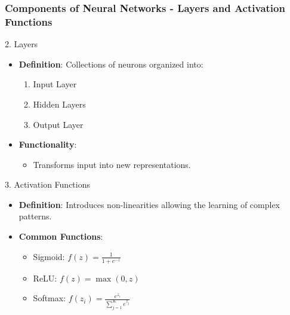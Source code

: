 \documentclass[aspectratio=169]{beamer}
\begin{document}
\begin{frame}[fragile]
    \frametitle{Components of Neural Networks - Layers and Activation Functions}
    \begin{block}{2. Layers}
        \begin{itemize}
            \item \textbf{Definition}: Collections of neurons organized into:
                \begin{enumerate}
                    \item Input Layer
                    \item Hidden Layers
                    \item Output Layer
                \end{enumerate}
            \item \textbf{Functionality}:
            \begin{itemize}
                \item Transforms input into new representations.
            \end{itemize}
        \end{itemize}
    \end{block}
    
    \begin{block}{3. Activation Functions}
        \begin{itemize}
            \item \textbf{Definition}: Introduces non-linearities allowing the learning of complex patterns.
            \item \textbf{Common Functions}:
            \begin{itemize}
                \item Sigmoid: $f(z) = \frac{1}{1 + e^{-z}}$
                \item ReLU: $f(z) = \max(0, z)$
                \item Softmax: $f(z_i) = \frac{e^{z_i}}{\sum_{j=1}^{K} e^{z_j}}$
            \end{itemize}
        \end{itemize}
    \end{block}
\end{frame}
\end{document}
